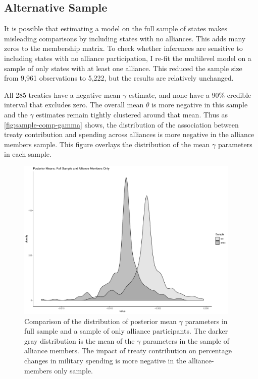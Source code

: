 \documentclass[12pt]{article}
\begin{document}
\subsection{Alternative Sample} 


It is possible that estimating a model on the full sample of states makes misleading comparisons by including states with no alliances.
This adds many zeros to the membership matrix. 
To check whether inferences are sensitive to including states with no alliance participation, I re-fit the multilevel model on a sample of only states with at least one alliance. 
This reduced the sample size from 9,961 observations to 5,222, but the results are relatively unchanged. 


All 285 treaties have a negative mean $\gamma$ estimate, and none have a 90\% credible interval that excludes zero.
The overall mean $\theta$ is more negative in this sample and the $\gamma$ estimates remain tightly clustered around that mean. 
Thus as \autoref{fig:sample-comp-gamma} shows, the distribution of the association between treaty contribution and spending across alliances is more negative in the alliance members sample. 
This figure overlays the distribution of the mean $\gamma$ parameters in each sample. 


\begin{figure}
	\centering
		\includegraphics[width=0.95\textwidth]{sample-comp-gamma.pdf}
	\caption{Comparison of the distribution of posterior mean $\gamma$ parameters in full sample and a sample of only alliance participants. The darker gray distribution is the mean of the $\gamma$ parameters in the sample of alliance members. The impact of treaty contribution on percentage changes in military spending is more negative in the alliance-members only sample.}
	\label{fig:sample-comp-gamma}
\end{figure}
\end{document}
